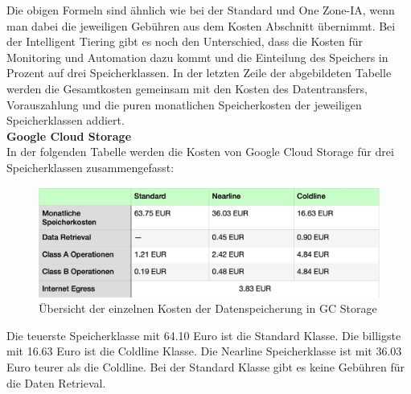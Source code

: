 Die obigen Formeln sind ähnlich wie bei der Standard und One Zone-IA, wenn man dabei die jeweiligen Gebühren aus dem Kosten Abschnitt übernimmt. Bei der Intelligent Tiering gibt es noch den Unterschied, dass die Kosten für Monitoring und Automation dazu kommt und die Einteilung des Speichers in Prozent auf drei Speicherklassen. In der letzten Zeile der abgebildeten Tabelle werden die Gesamtkosten gemeinsam mit den Kosten des Datentransfers, Vorauszahlung und die puren monatlichen Speicherkosten der jeweiligen Speicherklassen addiert.\\

\textbf{Google Cloud Storage}\\

In der folgenden Tabelle werden die Kosten von Google Cloud Storage für drei Speicherklassen zusammengefasst:

\begin{figure}[h]
\centering
	\includegraphics[width=12cm,keepaspectratio]{Pictures/GCKostenOhneGesamt.png}
	\caption{Übersicht der einzelnen Kosten der Datenspeicherung in GC Storage}
\end{figure}

Die teuerste Speicherklasse mit 64.10 Euro ist die Standard Klasse. Die billigste mit 16.63 Euro ist die Coldline Klasse. Die Nearline Speicherklasse ist mit 36.03 Euro teurer als die Coldline. Bei der Standard Klasse gibt es keine Gebühren für die Daten Retrieval.